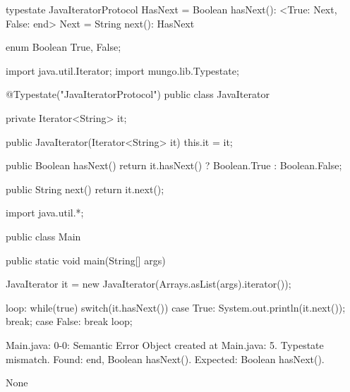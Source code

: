 \begin{code}
typestate JavaIteratorProtocol {
  HasNext = {
    Boolean hasNext(): <True: Next, False: end>
  }
  Next = {
    String next(): HasNext
  }
}\end{code}

\begin{code}
enum Boolean {
	True, False;
}\end{code}

\begin{code}
import java.util.Iterator;
import mungo.lib.Typestate;

@Typestate("JavaIteratorProtocol")
public class JavaIterator {

  private Iterator<String> it;

  public JavaIterator(Iterator<String> it) {
    this.it = it;
  }

	public Boolean hasNext() {
    return it.hasNext() ? Boolean.True : Boolean.False;
  }

  public String next() {
    return it.next();
  }

}\end{code}

\begin{code}
import java.util.*;

public class Main {
	public static void main(String[] args) {
		JavaIterator it = new JavaIterator(Arrays.asList(args).iterator());

    loop: while(true) {
      switch(it.hasNext()) {
        case True:
          System.out.println(it.next());
          break;
        case False:
          break loop;
      }
    }
	}
}\end{code}

\lstset{language=,caption=Original Mungo output}
\begin{code}

Main.java: 0-0: Semantic Error
		Object created at Main.java: 5. Typestate mismatch. Found: end, Boolean hasNext(). Expected: Boolean hasNext().
\end{code}

\lstset{language=,caption=New Mungo output}
\begin{code}
None
\end{code}

